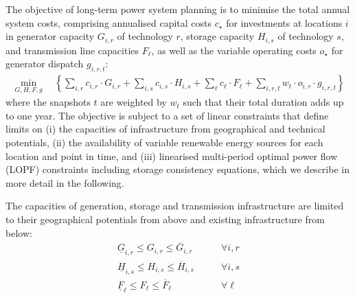 The objective of long-term power system planning is to minimise the total
annual system costs, comprising annualised capital costs $c_\star$ for investments at locations $i$
in generator capacity $G_{i,r}$ of technology $r$, storage capacity $H_{i,s}$ of technology $s$, and transmission line capacities
$F_{\ell}$, as well as the variable operating costs $o_\star$ for generator dispatch $g_{i,r,t}$:
\begin{align}
    \min_{G,H,F,g} \quad \left\{
        \sum_{i,r}   c_{i,r}  \cdot G_{i,r}  +
        \sum_{i,s}   c_{i,s}  \cdot H_{i,s}  +
        \sum_{\ell}  c_{\ell} \cdot F_{\ell} +
        \sum_{i,r,t} w_t \cdot o_{i,r} \cdot g_{i,r,t}
    \right\}
    \label{eq:objective}
\end{align}
where the snapshots $t$ are weighted by $w_t$ such that their total duration
adds up to one year. The objective is subject to a set of linear constraints that define limits on
(i) the capacities of infrastructure from geographical and technical potentials,
(ii) the availability of variable renewable energy sources for each location and point in time, and
(iii) linearised multi-period optimal power flow (LOPF) constraints including storage consistency equations,
which we describe in more detail in the following.

The capacities of generation, storage and transmission infrastructure are
limited to their geographical potentials from above and existing infrastructure from below:
\begin{align}
    \label{eq:firstA}
    \underline{G}_{i,r}  \leq G_{i,r}  \leq \overline{G}_{i,r}  &\qquad\forall i, r \\
    \underline{H}_{i,s}  \leq H_{i,s}  \leq \overline{H}_{i,s}  &\qquad\forall i, s \\
    \underline{F}_{\ell} \leq F_{\ell} \leq \overline{F}_{\ell} &\qquad\forall \ell
\end{align}

